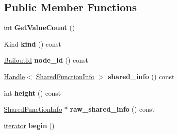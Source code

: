 \subsection*{Public Member Functions}
\begin{DoxyCompactItemize}
\item 
int {\bfseries Get\+Value\+Count} ()\hypertarget{classv8_1_1internal_1_1_translated_frame_a689c1d2b07853f5e222509f8b0c7cd5f}{}\label{classv8_1_1internal_1_1_translated_frame_a689c1d2b07853f5e222509f8b0c7cd5f}

\item 
Kind {\bfseries kind} () const \hypertarget{classv8_1_1internal_1_1_translated_frame_a2ce968e294fc80171218fee72a8f60f7}{}\label{classv8_1_1internal_1_1_translated_frame_a2ce968e294fc80171218fee72a8f60f7}

\item 
\hyperlink{classv8_1_1internal_1_1_bailout_id}{Bailout\+Id} {\bfseries node\+\_\+id} () const \hypertarget{classv8_1_1internal_1_1_translated_frame_a54621688ca5f96a1e82acadd98780cd2}{}\label{classv8_1_1internal_1_1_translated_frame_a54621688ca5f96a1e82acadd98780cd2}

\item 
\hyperlink{classv8_1_1internal_1_1_handle}{Handle}$<$ \hyperlink{classv8_1_1internal_1_1_shared_function_info}{Shared\+Function\+Info} $>$ {\bfseries shared\+\_\+info} () const \hypertarget{classv8_1_1internal_1_1_translated_frame_adaa1c7c91eedff3fc2b24a85bc39375c}{}\label{classv8_1_1internal_1_1_translated_frame_adaa1c7c91eedff3fc2b24a85bc39375c}

\item 
int {\bfseries height} () const \hypertarget{classv8_1_1internal_1_1_translated_frame_a444e59fdd4025b8b583132381610d528}{}\label{classv8_1_1internal_1_1_translated_frame_a444e59fdd4025b8b583132381610d528}

\item 
\hyperlink{classv8_1_1internal_1_1_shared_function_info}{Shared\+Function\+Info} $\ast$ {\bfseries raw\+\_\+shared\+\_\+info} () const \hypertarget{classv8_1_1internal_1_1_translated_frame_a5ae8679ef796c246a4b9344579d183d3}{}\label{classv8_1_1internal_1_1_translated_frame_a5ae8679ef796c246a4b9344579d183d3}

\item 
\hyperlink{classv8_1_1internal_1_1_translated_frame_1_1iterator}{iterator} {\bfseries begin} ()\hypertarget{classv8_1_1internal_1_1_translated_frame_ab8fe3880b57f7f14f4ebfd907dfeb723}{}\label{classv8_1_1internal_1_1_translated_frame_ab8fe3880b57f7f14f4ebfd907dfeb723}


\end{DoxyCompactItemize}
